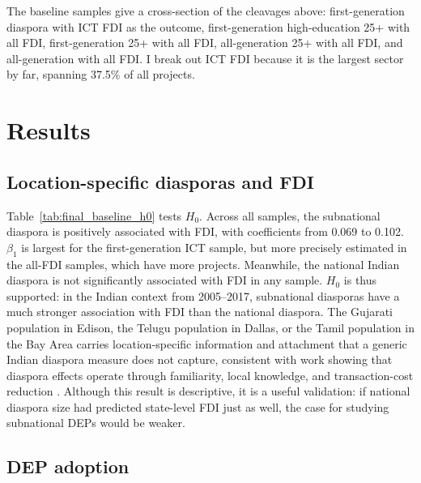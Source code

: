 \documentclass[12pt]{article}
\begin{document}
The baseline samples give a cross-section of the cleavages above: first-generation diaspora with ICT FDI as the outcome, first-generation high-education 25+ with all FDI, first-generation 25+ with all FDI, all-generation 25+ with all FDI, and all-generation with all FDI. I break out ICT FDI because it is the largest sector by far, spanning 37.5\% of all projects.

\section{Results} \label{sec:results}

\subsection{Location-specific diasporas and FDI}

Table~\ref{tab:final_baseline_h0} tests $H_0$. Across all samples, the subnational diaspora is positively associated with FDI, with coefficients from 0.069 to 0.102. $\beta_1$ is largest for the first-generation ICT sample, but more precisely estimated in the all-FDI samples, which have more projects. Meanwhile, the national Indian diaspora is not significantly associated with FDI in any sample. $H_0$ is thus supported: in the Indian context from 2005--2017, subnational diasporas have a much stronger association with FDI than the national diaspora. The Gujarati population in Edison, the Telugu population in Dallas, or the Tamil population in the Bay Area carries location-specific information and attachment that a generic Indian diaspora measure does not capture, consistent with work showing that diaspora effects operate through familiarity, local knowledge, and transaction-cost reduction \citep{leblang_familiarity_2010, kugler_migration_2018, useche_highly_2020}. Although this result is descriptive, it is a useful validation: if national diaspora size had predicted state-level FDI just as well, the case for studying subnational DEPs would be weaker.



\subsection{DEP adoption}
\end{document}

